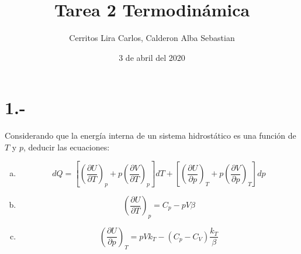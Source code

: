 \documentclass{article}
\title{Tarea 2 Termodinámica}
\author{Cerritos Lira Carlos, Calderon Alba Sebastian}
\date{3 de abril del 2020}
\begin{document}
\maketitle
\section*{1.-}
Considerando que la energía interna de un sistema hidrostático es una función de $T$ y $p$, 
deducir las ecuaciones:
\begin{enumerate}[a)]
    \item \[ dQ 
    = \left[\left(\frac{\partial U}{\partial T}\right)_p + p\left( \frac{\partial V}{\partial T} \right)_p \right] dT
    + \left[\left(\frac{\partial U}{\partial p}\right)_T + p\left( \frac{\partial V}{\partial p} \right)_T \right] dp \]
    \item \[\left(\frac{\partial U}{\partial T}\right)_p 
    = C_p - pV\beta \]
    \item \[\left( \frac{\partial U}{\partial p}\right)_T 
    = pVk_T - (C_p-C_V)\frac{k_T}{\beta} \]
\end{enumerate}
\end{document}

